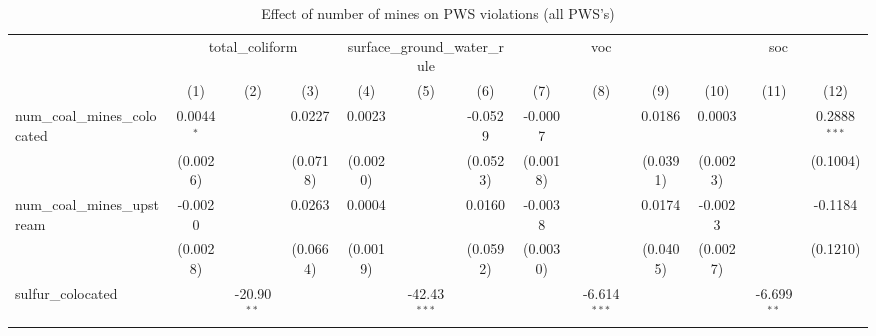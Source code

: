 
\begin{table}[htbp]
   \caption{\label{olsrf2sls_nummine_non_mine_vio_binary_1985to2005allhucs} Effect of number of mines on PWS violations (all PWS's)}
   \bigskip
   \centering
   \begin{adjustbox}{width = \textwidth, center}
      \begin{tabular}{lcccccccccccc}
         \toprule
          & \multicolumn{3}{c}{total\_coliform} & \multicolumn{3}{c}{surface\_ground\_water\_rule} & \multicolumn{3}{c}{voc} & \multicolumn{3}{c}{soc}\\
                                                            & (1)           & (2)                   & (3)                   & (4)           & (5)            & (6)           & (7)           & (8)                   & (9)                   & (10)                  & (11)            & (12)\\  
         \midrule 
         num\_coal\_mines\_colocated                        & 0.0044$^{*}$  &                       & 0.0227                & 0.0023        &                & -0.0529       & -0.0007       &                       & 0.0186                & 0.0003                &                 & 0.2888$^{***}$\\   
                                                            & (0.0026)      &                       & (0.0718)              & (0.0020)      &                & (0.0523)      & (0.0018)      &                       & (0.0391)              & (0.0023)              &                 & (0.1004)\\   
         num\_coal\_mines\_upstream                         & -0.0020       &                       & 0.0263                & 0.0004        &                & 0.0160        & -0.0038       &                       & 0.0174                & -0.0023               &                 & -0.1184\\   
                                                            & (0.0028)      &                       & (0.0664)              & (0.0019)      &                & (0.0592)      & (0.0030)      &                       & (0.0405)              & (0.0027)              &                 & (0.1210)\\   
         sulfur\_colocated                                  &               & -20.90$^{**}$         &                       &               & -42.43$^{***}$ &               &               & -6.614$^{***}$        &                       &                       & -6.699$^{**}$   &   \\   

\end{tabular}
\end{adjustbox}
\end{table}
